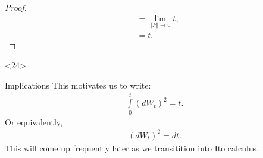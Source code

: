 \documentclass[10pt]{beamer}
\begin{document}
\begin{frame}[t]
\begin{onlyenv}
\begin{proof}
\begin{align*}
          &= \lim\limits_{\Vert P \Vert \to 0} t, \\
          &= t.
        \end{align*}
      \end{proof}
    \end{onlyenv}
    \begin{onlyenv}<24>
      \begin{block}{Implications}
        This motivates us to write:
        \begin{align*}
          \int\limits_{0}^{t}(dW_t)^2 = t.
        \end{align*}
        Or equivalently,
        \begin{align*}
          (dW_t)^2 = dt.
        \end{align*}
        This will come up frequently later as we transitition into Ito calculus.
      \end{block}
  \end{onlyenv}
\end{frame}
\end{document}
